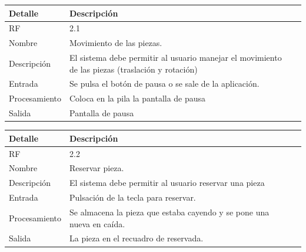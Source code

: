\documentclass{article}
\begin{document}
\begin{table}[H]
  \begin{center}
    \begin{tabularx}{\linewidth}{|X|X|X|} %
      \hline
      \textbf{Detalle} & \textbf{Descripción}\\
      \hline
      RF & 2.1 \\
      \hline
      Nombre & Movimiento de las piezas.\\
      \hline
      Descripción & El sistema debe permitir al usuario manejar el movimiento de las piezas (traslación y rotación)\\
      \hline
      Entrada & Se pulsa el botón de pausa o se sale de la aplicación.\\
      \hline
      Procesamiento & Coloca en la pila la pantalla de pausa\\
      \hline
      Salida & Pantalla de pausa\\
      \hline
    \end{tabularx}
  \end{center}
\end{table}

\begin{table}[H]
  \begin{center}
    \begin{tabularx}{\linewidth}{|X|X|X|} %
      \hline
      \textbf{Detalle} & \textbf{Descripción}\\
      \hline
      RF & 2.2 \\
      \hline
      Nombre & Reservar pieza.\\
      \hline
      Descripción & El sistema debe permitir al usuario reservar una pieza\\
      \hline
      Entrada & Pulsación de la tecla para reservar.\\
      \hline
      Procesamiento & Se almacena la pieza que estaba cayendo y se pone una nueva en caída.\\
      \hline
      Salida & La pieza en el recuadro de reservada.\\
      \hline
    \end{tabularx}
  \end{center}
\end{table}
\end{document}
